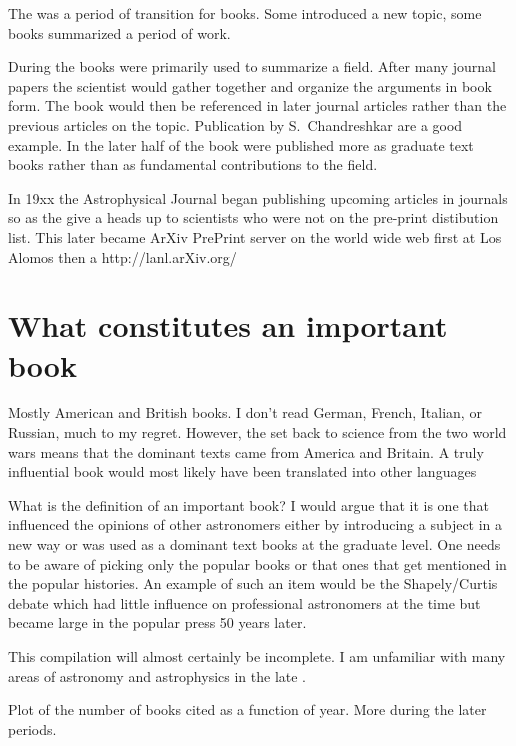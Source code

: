 The  was a period of transition for books. Some introduced a
new topic, some books summarized a period of work.

During the  books were primarily used to summarize a field.
After many journal papers the scientist would gather together and
organize the arguments in book form.  The book would then be
referenced in later journal articles rather than the previous articles
on the topic. Publication by S.\ Chandreshkar are a good example. In
the later half of the  book were published more as graduate
text books rather than as fundamental contributions to the field.

In 19xx the Astrophysical Journal began publishing upcoming articles
in journals so as the give a heads up to scientists who were not on
the pre-print distibution list.  This later became ArXiv PrePrint
server on the world wide web first at Los Alomos then a
http://lanl.arXiv.org/


\section{What constitutes an important book}

Mostly American and British books. I don't read German, French,
Italian, or Russian, much to my regret.  However, the set back to
science from the two world wars means that the dominant texts came
from America and Britain. A truly influential book would most likely
have been translated into other languages

What is the definition of an important book? I would argue that it is
one that influenced the opinions of other astronomers either by
introducing a subject in a new way or was used as a dominant text
books at the graduate level.  One needs to be aware of picking only
the popular books or that ones that get mentioned in the popular
histories.  An example of such an item would be the Shapely/Curtis
debate which had little influence on professional astronomers at the
time but became large in the popular press 50 years later.

This compilation will almost certainly be incomplete.  I am unfamiliar
with many areas of astronomy and astrophysics in the late .

Plot of the number of books cited as a function of year.  More during
the later periods.

